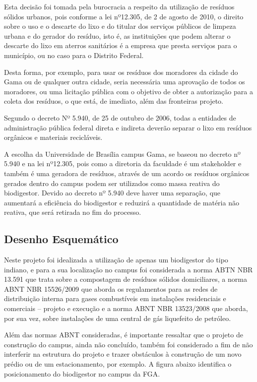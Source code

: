 \par Esta decisão foi tomada pela burocracia a respeito da utilização de resíduos sólidos urbanos, pois conforme a lei nº12.305, de 2 de agosto de 2010, o direito sobre o uso e o descarte do lixo e do titular dos serviços públicos de limpeza urbana e do gerador do resíduo, isto é, as instituições que podem alterar o descarte do lixo em aterros sanitários é a empresa que presta serviços para o município, ou no caso para o Distrito Federal.
\par Desta forma, por exemplo, para usar os resíduos dos moradores da cidade do Gama ou de qualquer outra cidade, seria necessária uma aprovação de todos os moradores, ou uma licitação pública com o objetivo de obter a autorização para a coleta dos resíduos, o que está, de imediato, além das fronteiras projeto.
\par Segundo o decreto Nº 5.940, de 25 de outubro de 2006, todas a entidades de administração pública federal direta e indireta deverão separar o lixo em resíduos orgânicos e materiais recicláveis.
\par A escolha da Universidade de Brasília campus Gama, se baseou no decreto nº 5.940 e na lei nº12.305, pois como a diretoria da faculdade é um stakeholder e também é uma geradora de resíduos, através de um acordo os resíduos orgânicos gerados dentro do campus podem ser utilizados como massa reativa do biodigestor. Devido ao decreto nº 5.940 deve haver uma separação, que aumentará a eficiência do biodigestor e reduzirá a quantidade de matéria não reativa, que será retirada no fim do processo.

\subsection {Desenho Esquemático}
Neste projeto foi idealizada a utilização de apenas um biodigestor do tipo indiano, e para a sua localização no campus foi considerada a norma ABTN NBR 13.591 que trata sobre a compostagem de resíduos sólidos domiciliares, a norma ABNT NBR 15526/2009 que aborda os regulamentos para as redes de distribuição interna para gases combustíveis em instalações residenciais e comerciais – projeto e execução e a norma ABNT NBR 13523/2008 que aborda, por sua vez, sobre instalações de uma central de gás liquefeito de petróleo.
\par Além das normas ABNT consideradas, é importante ressaltar que o projeto de construção do campus, ainda não concluído, também foi considerado a fim de não interferir na estrutura do projeto e trazer obstáculos à construção de um novo prédio ou de um estacionamento, por exemplo. A figura abaixo identifica o posicionamento do biodigestor no campus da FGA.

